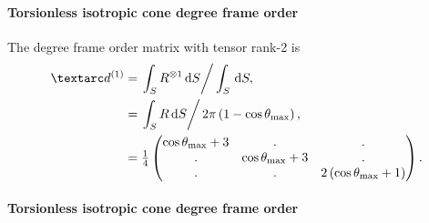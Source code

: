 \paragraph{Torsionless isotropic cone  degree frame order}

The  degree frame order matrix with tensor rank-2 is
\begin{subequations} \label{eq: iso cone, torsionless 1st degree frame order matrix}
\begin{align}
    \FOone &= \left. \int_S R^{\otimes 1} \diff S \right / \int_S \diff S , \\
           &= \left. \int_S R \diff S \right / 2\pi \left( 1 - \cos\conethetamax \right) , \\
           &= \quart \begin{pmatrix}
                  \cos\conethetamax + 3 & .                     & . \\
                  .                     & \cos\conethetamax + 3 & . \\
                  .                     & .                     & 2\left( \cos\conethetamax + 1 \right) \\
              \end{pmatrix} .
\end{align}
\end{subequations}


\paragraph{Torsionless isotropic cone  degree frame order}

